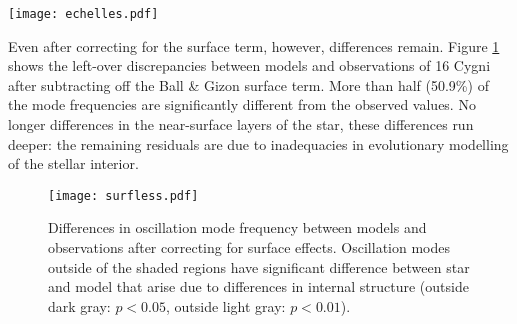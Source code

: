 \documentclass[twocolumn,twocolappendix]{aastex6}
\begin{document}
\begin{figure*}%
    \centering
    \texttt{[image: echelles.pdf]}
    \caption{\`Echelle diagrams comparing frequencies of a solar model to BiSON data (left) and models of 16 Cyg A and B to \emph{Kepler} data (center and right, respectively). The dashed black line indicates the large frequency separation ($\Delta\nu$). The dotted gray line indicates the frequency at which power is maximum ($\nu_{\max}$). 
    Open symbols are model frequencies and filled symbols are observed frequencies. 
    Spherical degrees of \textcolor{echelle-yellow}{2}, \textcolor{echelle-blue}{0}, \textcolor{echelle-red}{3}, and \textcolor{echelle-black}{1} are colored with \textcolor{echelle-yellow}{yellow circles}, \textcolor{echelle-blue}{blue squares}, \textcolor{echelle-red}{red triangles}, and \textcolor{echelle-black}{black diamonds}, respectively. Arrows show $1\sigma$ uncertainties, which in most cases are so small as to be invisible. Model frequencies significantly differ from observed frequencies in almost all cases. }
    \label{fig:echelle} 
\end{figure*}

Even after correcting for the surface term, however, differences remain. Figure \ref{fig:bg-corr} shows the left-over discrepancies between models and observations of 16 Cygni after subtracting off the Ball \& Gizon surface term. 
More than half (50.9\%) of the mode frequencies are significantly different from the observed values. 
No longer differences in the near-surface layers of the star, these differences run deeper: the remaining residuals are due to inadequacies in evolutionary modelling of the stellar interior. 

\begin{figure}%
    \centering
    \texttt{[image: surfless.pdf]}
    \caption{Differences in oscillation mode frequency between models and observations after correcting for surface effects. %
    Oscillation modes outside of the shaded regions have significant difference between star and model that arise due to differences in internal structure (outside dark gray: $p < 0.05$, outside light gray: $p < 0.01$). 
    } 
    \label{fig:bg-corr}
\end{figure}
\end{document}
